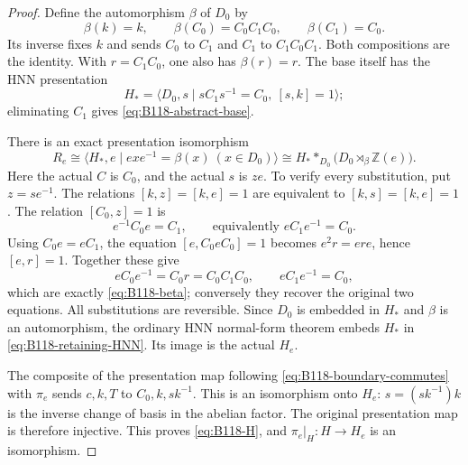 \begin{proof}
Define the automorphism $\beta$ of $D_0$ by
\begin{equation}\label{eq:B118-beta}
 \beta(k)=k,\qquad
 \beta(C_0)=C_0C_1C_0,\qquad \beta(C_1)=C_0.
\end{equation}
Its inverse fixes $k$ and sends $C_0$ to $C_1$ and $C_1$ to
$C_1C_0C_1$. Both compositions are the identity. With
$r=C_1C_0$, one also has $\beta(r)=r$.
The base itself has the HNN presentation
\begin{equation}\label{eq:B118-base-HNN}
 H_*=
 \langle D_0,s\mid sC_1s^{-1}=C_0,\ [s,k]=1\rangle;
\end{equation}
eliminating $C_1$ gives \eqref{eq:B118-abstract-base}.

There is an exact presentation isomorphism
\begin{equation}\label{eq:B118-retaining-HNN}
 R_e\cong
 \langle H_*,e\mid e x e^{-1}=\beta(x)\ (x\in D_0)\rangle
 \cong H_* *_{D_0}\bigl(D_0\rtimes_{\beta}\mathbb Z(e)\bigr).
\end{equation}
Here the actual $C$ is $C_0$, and the actual $s$ is $ze$.
To verify every substitution, put $z=se^{-1}$.
The relations $[k,z]=[k,e]=1$ are equivalent to
$[k,s]=[k,e]=1$. The relation $[C_0,z]=1$ is
\[
 e^{-1}C_0e=C_1,\qquad\text{equivalently }eC_1e^{-1}=C_0.
\]
Using $C_0e=eC_1$, the equation $[e,C_0eC_0]=1$ becomes
$e^2r=ere$, hence $[e,r]=1$. Together these give
\[
 eC_0e^{-1}=C_0r=C_0C_1C_0,
 \qquad eC_1e^{-1}=C_0,
\]
which are exactly \eqref{eq:B118-beta}; conversely they recover
the original two equations. All substitutions are reversible.
Since $D_0$ is embedded in $H_*$ and $\beta$ is an automorphism,
the ordinary HNN normal-form theorem embeds $H_*$ in
\eqref{eq:B118-retaining-HNN}. Its image is the actual $H_e$.

The composite of the presentation map following
\eqref{eq:B118-boundary-commutes} with $\pi_e$ sends
$c,k,T$ to $C_0,k,sk^{-1}$. This is an isomorphism onto $H_e$:
$s=(sk^{-1})k$ is the inverse change of basis in the abelian factor.
The original presentation map is therefore injective. This proves
\eqref{eq:B118-H}, and $\pi_e|_H:H\to H_e$ is an isomorphism.


\end{proof}
